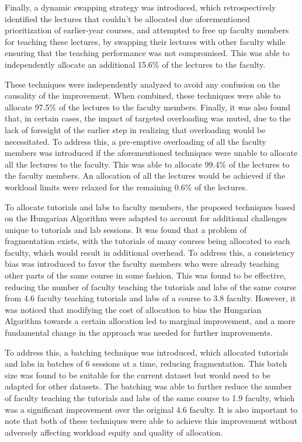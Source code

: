 Finally, a dynamic swapping strategy was introduced, which retrospectively identified the lectures that couldn't be allocated due aforementioned prioritization of earlier-year courses, and attempted to free up faculty members for teaching these lectures, by swapping their lectures with other faculty while ensuring that the teaching performance was not compromised. This was able to independently allocate an additional 15.6\% of the lectures to the faculty.

These techniques were independently analyzed to avoid any confusion on the causality of the improvement. When combined, these techniques were able to allocate 97.5\% of the lectures to the faculty members. Finally, it was also found that, in certain cases, the impact of targeted overloading was muted, due to the lack of foresight of the earlier step in realizing that overloading would be necessitated. To address this, a pre-emptive overloading of all the faculty members was introduced if the aforementioned techniques were unable to allocate all the lectures to the faculty. This was able to allocate 99.4\% of the lectures to the faculty members. An allocation of all the lectures would be achieved if the workload limits were relaxed for the remaining 0.6\% of the lectures.

To allocate tutorials and labs to faculty members, the proposed techniques based on the Hungarian Algorithm were adapted to account for additional challenges unique to tutorials and lab sessions. It was found that a problem of fragmentation exists, with the tutorials of many courses being allocated to each faculty, which would result in additional overhead. To address this, a consistency bias was introduced to favor the faculty members who were already teaching other parts of the same course in some fashion. This was found to be effective, reducing the number of faculty teaching the tutorials and labs of the same course from 4.6 faculty teaching tutorials and labs of a course to 3.8 faculty. However, it was noticed that modifying the cost of allocation to bias the Hungarian Algorithm towards a certain allocation led to marginal improvement, and a more fundamental change in the approach was needed for further improvements.

To address this, a batching technique was introduced, which allocated tutorials and labs in batches of 6 sessions at a time, reducing fragmentation. This batch size was found to be suitable for the current dataset but would need to be adapted for other datasets. The batching was able to further reduce the number of faculty teaching the tutorials and labs of the same course to 1.9 faculty, which was a significant improvement over the original 4.6 faculty. It is also important to note that both of these techniques were able to achieve this improvement without adversely affecting workload equity and quality of allocation.



